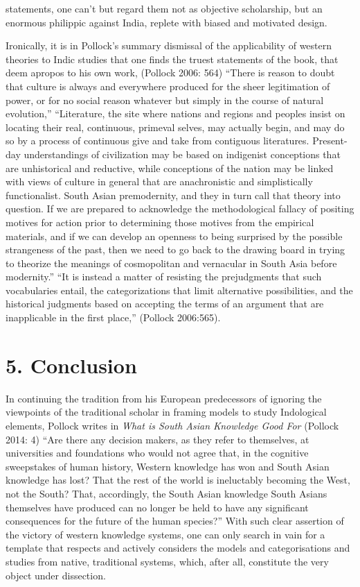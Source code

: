 statements, one can’t but regard them not as objective scholarship, but an enormous philippic against India, replete with biased and motivated design.

Ironically, it is in Pollock’s summary dismissal of the applicability of western theories to Indic studies that one finds the truest statements of the book, that deem apropos to his own work, (Pollock 2006: 564) “There is reason to doubt that culture is always and everywhere produced for the sheer legitimation of power, or for no social reason whatever but simply in the course of natural evolution,” “Literature, the site where nations and regions and peoples insist on locating their real, continuous, primeval selves, may actually begin, and may do so by a process of continuous give and take from contiguous literatures. Present-day understandings of civilization may be based on indigenist conceptions that are unhistorical and reductive, while conceptions of the nation may be linked with views of culture in general that are anachronistic and simplistically functionalist. South Asian premodernity, and they in turn call that theory into question. If we are prepared to acknowledge the methodological fallacy of positing motives for action prior to determining those motives from the empirical materials, and if we can develop an openness to being surprised by the possible strangeness of the past, then we need to go back to the drawing board in trying to theorize the meanings of cosmopolitan and vernacular in South Asia before modernity.” “It is instead a matter of resisting the prejudgments that such vocabularies entail, the categorizations that limit alternative possibilities, and the historical judgments based on accepting the terms of an argument that are inapplicable in the first place,” (Pollock 2006:565).


\section*{5. Conclusion}

In continuing the tradition from his European predecessors of ignoring the viewpoints of the traditional scholar in framing models to study Indological elements, Pollock writes in \textit{What is South Asian Knowledge Good For} (Pollock 2014: 4) “Are there any decision makers, as they refer to themselves, at universities and foundations who would not agree that, in the cognitive sweepstakes of human history, Western knowledge has won and South Asian knowledge has lost? That the rest of the world is ineluctably becoming the West, not the South? That, accordingly, the South Asian knowledge South Asians themselves have produced can no longer be held to have any significant consequences for the future of the human species?” With such clear assertion of the victory of western knowledge systems, one can only search in vain for a template that respects and actively considers the models and categorisations and studies from native, traditional systems, which, after all, constitute the very object under dissection.

